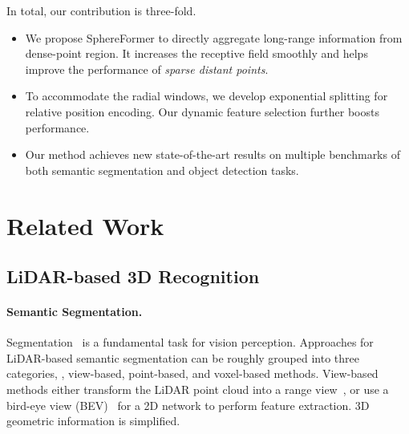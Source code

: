 \documentclass[10pt,twocolumn,letterpaper]{article}
\begin{document}
In total, our contribution is three-fold.
\begin{itemize}
    \item We propose SphereFormer to directly aggregate long-range information from dense-point region. It increases the receptive field smoothly and helps improve the performance of \textit{sparse distant points}.
    
    \item To accommodate the radial windows, we develop exponential splitting for relative position encoding. Our dynamic feature selection further boosts performance.
    
    \item Our method achieves new state-of-the-art results on multiple benchmarks of both semantic segmentation and object detection tasks.
\end{itemize}













\section{Related Work}

\subsection{LiDAR-based 3D Recognition}
\paragraph{Semantic Segmentation.}
Segmentation~\cite{ronneberger2015u,zhao2017pyramid,chen2018encoder,lai2021semi,lai2022decouplenet,tian2022adaptive,tian2023learning,tian2022generalized,chu2022twist,icm-3d,li2021simultaneous} is a fundamental task for vision perception. Approaches for LiDAR-based semantic segmentation can be roughly grouped into three categories, \ie, view-based, point-based, and voxel-based methods. View-based methods either transform the LiDAR point cloud into a range view~\cite{wu2019squeezesegv2,xu2020squeezesegv3,behley2019semantickitti,milioto2019rangenet++,razani2021lite}, or use a bird-eye view (BEV)~\cite{zhang2020polarnet} for a 2D network to perform feature extraction. 3D geometric information is simplified. 
\end{document}
